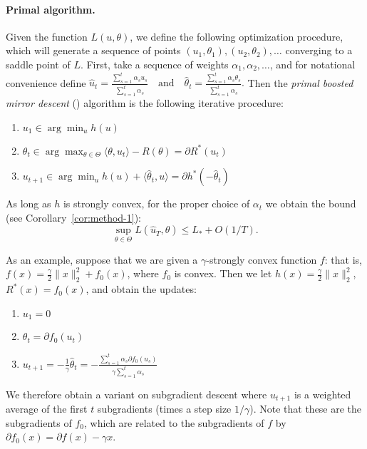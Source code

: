 \documentclass{article} %
\begin{document}
\paragraph{Primal algorithm.}
Given the function $L(u, \theta)$, we define the following 
optimization procedure, which will generate a sequence of 
points $(u_1,\theta_1), (u_2, \theta_2), \ldots$ converging 
to a saddle point of $L$. First, take a sequence of weights
$\alpha_1, \alpha_2, \ldots$, and for notational convenience 
define
\(
\hat{u}_t = \frac{\sum_{s=1}^t \alpha_su_s}{\sum_{s=1}^t \alpha_s} 
\quad \text{and} \quad 
\hat{\theta}_t = \frac{\sum_{s=1}^t \alpha_s\theta_s}{\sum_{s=1}^t \alpha_s}.
\)
Then 
the {\em primal boosted mirror descent} (\primal) algorithm is the following iterative procedure:
\begin{enumerate}
\item $u_1 \in \arg\min_u h(u)$
\item $\theta_{t} \in \arg\max_{\theta \in \Theta} \langle \theta, u_t \rangle - R(\theta) = \partial R^{*}(u_{t})$
\item $u_{t+1} \in \arg\min_{u} h(u) + \langle \hat{\theta}_t, u \rangle = \partial h^{*}(-\hat\theta_{t})$
\end{enumerate}
As long as $h$ is strongly convex, for the proper choice of $\alpha_{t}$ we 
obtain the bound (see Corollary~\ref{cor:method-1}):
\begin{equation}
\sup_{\theta \in \Theta} L(\hat{u}_T, \theta) \leq L_{*} + O(1/T).
\end{equation}

As an example, suppose that we are given a $\gamma$-strongly convex function 
$f$: that is, $f(x) = \frac{\gamma}{2}\|x\|_2^2 + f_0(x)$, where $f_0$ is convex. 
Then we let $h(x) = \frac{\gamma}{2}\|x\|_2^2$, $R^*(x) = f_0(x)$, and obtain 
the updates:
\begin{enumerate}
\item $u_1 = 0$
\item $\theta_t = \partial f_0(u_t)$
\item $u_{t+1} = -\frac{1}{\gamma}\hat{\theta}_t = -\frac{\sum_{s=1}^t \alpha_s\partial f_0(u_s)}{\gamma \sum_{s=1}^t \alpha_s}$
\end{enumerate}
We therefore obtain a variant on subgradient descent where $u_{t+1}$ 
is a weighted average of the first $t$ subgradients (times a step size 
$1/\gamma$). Note that these are the subgradients of $f_0$, which are related 
to the subgradients of $f$ by $\partial f_0(x) = \partial f(x) - \gamma x$.
\end{document}
